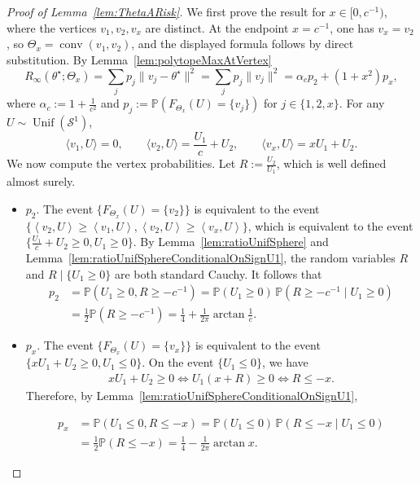 \documentclass[11pt]{article}
\theoremstyle{plain}
\theoremstyle{definition}
\renewcommand{\P}{\mathbb{P}}
\newcommand{\mcS}{\mathcal{S}}
\newcommand{\inp}[1]{\ensuremath{\left\langle #1 \right\rangle}}
\begin{document}
\begin{proof}[Proof of Lemma~\ref{lem:ThetaARisk}]
 We first prove the result for $x\in[0,c^{-1})$, where the vertices $v_1,v_2,v_x$ are distinct. At the endpoint $x=c^{-1}$, one has
$v_x=v_2$, so $\Theta_x=\operatorname{conv}(v_1,v_2)$, and the displayed formula follows by direct substitution.
By Lemma~\ref{lem:polytopeMaxAtVertex} 
\[
R_\infty(\theta^\star; \Theta_x)
=
\sum_{j} p_j \|v_j-\theta^\star\|^2
=
\sum_{j} p_j \|v_j\|^2
=
\alpha_c p_2 + (1+x^2)p_x,
\]
where $\alpha_c := 1+\frac{1}{c^2}$ and $p_j := \P (F_{\Theta_x}(U)=\{v_j\})$ for $j\in \{1,2,x\}$. For any $U \sim \operatorname{Unif}(\mcS^1)$, 
\[
\langle v_1,U\rangle = 0,
\qquad
\langle v_2,U\rangle = \frac{U_1}{c}+U_2,
\qquad
\langle v_x,U\rangle = x U_1 + U_2.
\]
We now compute the vertex probabilities. Let $R:=\frac{U_2}{U_1}$, which is well defined almost surely.
\begin{itemize}
\item $p_2$. The event 
$\{ F_{\Theta_x}(U) = \{v_2\} \}$ is equivalent to the event $\{ \inp{v_2,U} \ge \inp{v_1, U}, \inp{v_2,U} \ge \inp{v_x, U}\}$, which is equivalent to the event $\{\frac{U_1}{c} + U_2 \ge0, U_1 \ge 0 \}$. 
By 
Lemma~\ref{lem:ratioUnifSphere} and Lemma~\ref{lem:ratioUnifSphereConditionalOnSignU1}, the random variables $R$ and $R \mid\{U_1\ge0\}$ are both standard Cauchy. It follows that 
\begin{align*}
    p_2 &= \P(U_1 \ge 0, R\ge -c^{-1}) 
    = \P(U_1\ge0)\,\P(R \ge -c^{-1} \mid U_1\ge0) \\
    &= \frac12 \P(R \ge -c^{-1}) 
    =\frac14 + \frac{1}{2\pi} \arctan \frac1c .
\end{align*}

\item $p_x$. The event 
$\{ F_{\Theta_x}(U) = \{v_x\} \}$ is equivalent to the event $\{x U_1 + U_2 \ge0, U_1 \le 0 \}$. 
On the event $\{U_1\le 0\}$, we have
\begin{align*}
    x U_1 + U_2 \ge0 \iff U_1(x+R) \ge 0 \iff R \le -x.
\end{align*}
Therefore, by Lemma~\ref{lem:ratioUnifSphereConditionalOnSignU1},

\begin{align*}
    p_x 
    &= \P(U_1 \le 0, R\le -x) 
    = \P(U_1\le0)\,\P(R \le -x \mid U_1\le0) \\
    &= \frac12 \P(R \le -x)
    =\frac14 -\frac{1}{2\pi} \arctan x.
\end{align*}
\end{itemize}
\end{proof}
\end{document}
